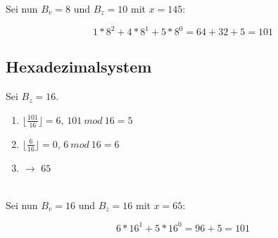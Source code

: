 \noindent
Sei nun $B_v=8$ und $B_z=10$ mit $x = 145$:

\begin{equation}
    1*8^2 + 4*8^1 + 5*8^0 = 64 + 32 + 5 = 101
\end{equation}


\subsection*{Hexadezimalsystem}
Sei $B_z = 16$.\\

\begin{enumerate}
    \item $\lfloor \frac{101}{16} \rfloor = 6$,  $101\ mod\ 16 = 5$
    \item $\lfloor \frac{6}{16} \rfloor = 0$, $6\ mod\ 16 = 6$
    \item[] $\rightarrow$ $65$
\end{enumerate}\\

Sei nun $B_v=16$ und $B_z=16$ mit $x = 65$:

\begin{equation}
    6*16^1 + 5*16^0 = 96 + 5 = 101
\end{equation}
